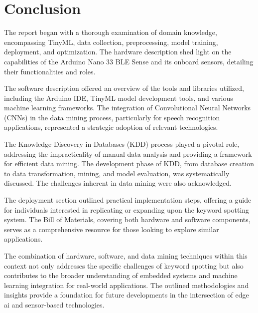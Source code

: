 %
%


\chapter{Conclusion}

The report began with a thorough examination of domain knowledge, encompassing TinyML, data collection, preprocessing, model training, deployment, and optimization. The hardware description shed light on the capabilities of the Arduino Nano 33 BLE Sense and its onboard sensors, detailing their functionalities and roles.

The software description offered an overview of the tools and libraries utilized, including the Arduino IDE, TinyML model development tools, and various machine learning frameworks. The integration of Convolutional Neural Networks (CNNs) in the data mining process, particularly for speech recognition applications, represented a strategic adoption of relevant technologies.

The Knowledge Discovery in Databases (KDD) process played a pivotal role, addressing the impracticality of manual data analysis and providing a framework for efficient data mining. The development phase of KDD, from database creation to data transformation, mining, and model evaluation, was systematically discussed. The challenges inherent in data mining were also acknowledged.

The deployment section outlined practical implementation steps, offering a guide for individuals interested in replicating or expanding upon the keyword spotting system. The Bill of Materials, covering both hardware and software components, serves as a comprehensive resource for those looking to explore similar applications.

The combination of hardware, software, and data mining techniques within this context not only addresses the specific challenges of keyword spotting but also contributes to the broader understanding of embedded systems and machine learning integration for real-world applications. The outlined methodologies and insights provide a foundation for future developments in the intersection of edge \ac{ai} and sensor-based technologies.

